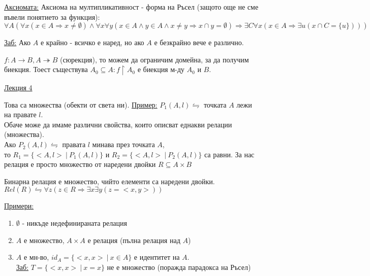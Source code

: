 \documentclass[fleqn, titlepage, 12pt]{report}
\begin{document}
\underline{Аксиомата:} Аксиома на мултипликативност - форма на Ръсел (защото още не сме въвели понятието за функция):\\
$ \forall{A} ( \forall{x} (x \in A \Rightarrow x \neq \emptyset) \land \forall{x} \forall{y} (
x \in A \land y \in A \land x \neq y \Rightarrow x \cap y = \emptyset)
\Rightarrow \exists{C} \forall{x} (x \in A \Rightarrow  \exists{u} (x \cap C = \{ u\})))$
\bigbreak

\underline{Заб:} Ако $A$ е крайно - всичко е наред, но ако $A$ е безкрайно вече е различно.
\bigbreak

$ f: A \rightarrow B, A \twoheadrightarrow B$ (сюрекция), то можем да ограничим домейна, за да получим биекция.
Тоест съществува $A_0 \subseteq A : f \upharpoonright A_0$ е биекция м-ду $A_0$ и $B$.

\clearpage
\begin{center}
  \underline{\huge\normalfont Лекция 4}
\end{center}
\bigbreak

 Това са множества (обекти от света ни).
\bigbreak
\underline{Пример:} $P_1(A,l) \leftrightharpoons$ точката $ A $ лежи на правате $l$.\\
Обаче може да имаме различни свойства, които описват еднакви релации (множества).\\
Ако $P_2(A,l) \leftrightharpoons$ правата $l$ минава през точката $A$,\\
то $R_1 = \{<A,l>\ |\ P_1(A,l)\}$ и $R_2 = \{<A,l>\ |\ P_2(A,l)\}$ са равни.
За нас релация е просто множество от наредени двойки $R \subseteq A \times B$
\bigbreak

 Бинарна релация е множество, чийто елементи са наредени двойки.\\
$Rel(R) \leftrightharpoons \forall{z}(z \in R \Rightarrow \exists{x} \exists{y}(z = <x,y>))$
\bigbreak

\underline{Примери:}
\begin{enumerate}
  \item $ \emptyset$ - никъде недефинираната релация
  \item $A$ е множество, $A \times A$ е релация (пълна релация над $A$)
  \item $A$ е мн-во, $id_A = \{<x,x>\ |\ x \in A\}$ е идентитет на $A$.\\
    \underline{Заб:} $T = \{<x,x>\ |\ x = x\}$ не е множество (поражда парадокса на Ръсел)
\end{enumerate}
\bigbreak
\end{document}
